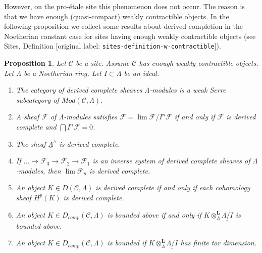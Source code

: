 \documentclass[10pt,a4paper]{article}
\theoremstyle{plain}
\newtheorem{proposition}[subsection]{Proposition}
\theoremstyle{definition}
\theoremstyle{remark}
\numberwithin{equation}{subsection}
\def\lim{\mathop{\mathrm{lim}}\nolimits}
\begin{document}
\medskip\noindent
However, on the pro-\'etale site this phenomenon does not occur.
The reason is that we have enough (quasi-compact) weakly contractible objects.
In the following proposition we collect some results about derived
completion in the Noetherian constant case for sites having enough
weakly contractible objects (see
Sites, Definition [original label: \nolinkurl{sites-definition-w-contractible}]).

\begin{proposition}
\label{proposition-enough-weakly-contractibles}
Let $\mathcal{C}$ be a site. Assume $\mathcal{C}$ has enough
weakly contractible objects.
Let $\Lambda$ be a Noetherian ring. Let $I \subset \Lambda$ be an ideal.
\begin{enumerate}
\item The category of derived complete sheaves $\Lambda$-modules is a
weak Serre subcategory of $\textit{Mod}(\mathcal{C}, \Lambda)$.
\item A sheaf $\mathcal{F}$ of $\Lambda$-modules satisfies
$\mathcal{F} = \lim \mathcal{F}/I^n\mathcal{F}$ if and only if
$\mathcal{F}$ is derived complete and $\bigcap I^n\mathcal{F} = 0$.
\item The sheaf $\underline{\Lambda}^\wedge$ is derived complete.
\item If $\ldots \to \mathcal{F}_3 \to \mathcal{F}_2 \to \mathcal{F}_1$
is an inverse system of derived complete sheaves of $\Lambda$-modules,
then $\lim \mathcal{F}_n$ is derived complete.
\item An object $K \in D(\mathcal{C}, \Lambda)$ is derived complete if
and only if each cohomology sheaf $H^p(K)$ is derived complete.
\item An object $K \in D_{comp}(\mathcal{C}, \Lambda)$ is bounded above
if and only if $K \otimes_\Lambda^\mathbf{L} \underline{\Lambda/I}$
is bounded above.
\item An object $K \in D_{comp}(\mathcal{C}, \Lambda)$ is bounded
if $K \otimes_\Lambda^\mathbf{L} \underline{\Lambda/I}$ has finite
tor dimension.
\end{enumerate}
\end{proposition}
\end{document}

